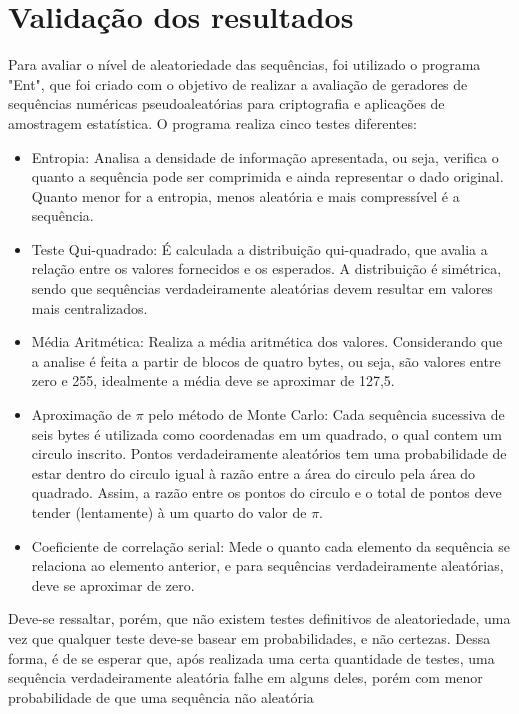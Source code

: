 \section{Validação dos resultados}
Para avaliar o nível de aleatoriedade das sequências, foi utilizado o programa "Ent", que foi criado com o objetivo de realizar a avaliação de geradores de sequências numéricas pseudoaleatórias para criptografia e aplicações de amostragem estatística. O programa realiza cinco testes diferentes:
\begin{itemize}
\item Entropia: Analisa a densidade de informação apresentada, ou seja, verifica o quanto a sequência pode ser comprimida e ainda representar o dado original. Quanto menor for a entropia, menos aleatória e mais compressível é a sequência.
\item Teste Qui-quadrado: É calculada a distribuição qui-quadrado, que avalia a relação entre os valores fornecidos e os esperados. A distribuição é simétrica, sendo que sequências verdadeiramente aleatórias devem resultar em valores mais centralizados.
\item Média Aritmética: Realiza a média aritmética dos valores. Considerando que a analise é feita a partir de blocos de quatro bytes, ou seja, são valores entre zero e 255, idealmente a média deve se aproximar de 127,5.
\item Aproximação de $\pi$ pelo método de Monte Carlo: Cada sequência sucessiva de seis bytes é utilizada como coordenadas em um quadrado, o qual contem um circulo inscrito. Pontos verdadeiramente aleatórios tem uma probabilidade de estar dentro do circulo igual à razão entre a área do circulo pela área do quadrado. Assim, a razão entre os pontos do circulo e o total de pontos deve tender (lentamente) à um quarto do valor de $\pi$.
\item Coeficiente de correlação serial: Mede o quanto cada elemento da sequência se relaciona ao elemento anterior, e para sequências verdadeiramente aleatórias, deve se aproximar de zero.
\end{itemize}
Deve-se ressaltar, porém, que não existem testes definitivos de aleatoriedade, uma vez que qualquer teste deve-se basear em probabilidades, e não certezas. Dessa forma, é de se esperar que, após realizada uma certa quantidade de testes, uma sequência verdadeiramente aleatória falhe em alguns deles, porém com menor probabilidade de que uma sequência não aleatória